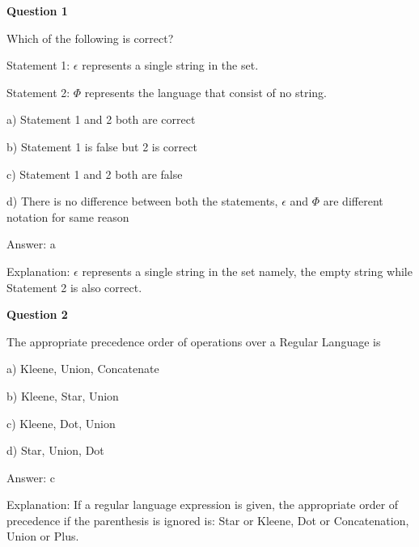 \documentclass{article}
\begin{document}
\begin{mdframed}[linewidth=1pt, roundcorner=5pt, linecolor=gray!30, backgroundcolor=gray!5]
\textbf{Question 1} 

Which of the following is correct?

Statement 1: $\epsilon$ represents a single string in the set.

Statement 2: $\Phi$ represents the language that consist of no string.

a) Statement 1 and 2 both are correct

b) Statement 1 is false but 2 is correct

c) Statement 1 and 2 both are false

d) There is no difference between both the statements, $\epsilon$ and $\Phi$ are different notation for same reason
\vspace{5pt} \par
\begin{tcolorbox}[colback=green!5, colframe=green!40!black, title=Solution]
Answer: a

Explanation: $\epsilon$ represents a single string in the set namely, the empty string while Statement 2 is also correct.
\end{tcolorbox}
\end{mdframed}

\begin{mdframed}[linewidth=1pt, roundcorner=5pt, linecolor=gray!30, backgroundcolor=gray!5]
\textbf{Question 2} 

The appropriate precedence order of operations over a Regular Language is

a) Kleene, Union, Concatenate

b) Kleene, Star, Union

c) Kleene, Dot, Union

d) Star, Union, Dot
\vspace{5pt} \par
\begin{tcolorbox}[colback=green!5, colframe=green!40!black, title=Solution]
Answer: c

Explanation: If a regular language expression is given, the appropriate order of precedence if the parenthesis is ignored is: Star or Kleene, Dot or Concatenation, Union or Plus.
\end{tcolorbox}
\end{mdframed}
\end{document}
